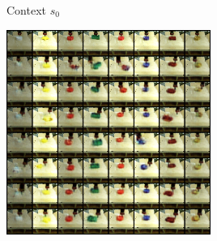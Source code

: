 \documentclass{article}
\begin{document}
\begin{figure}
    \centering
    \begin{subfigure}[b]{0.16\textwidth}
        \center
        Context $s_0$ \vspace{0.4cm}
    \end{subfigure}
    \begin{subfigure}[b]{0.4\textwidth}
        \center
         {
        }
    \end{subfigure}
    \hspace{0.1cm}
    \begin{subfigure}[b]{0.4\textwidth}
        \center
         {
        \includegraphics[height=252.5px]{img/cvae_samples_real_pusher3b.png}
        }
    \end{subfigure}
    \vspace{0.1cm}


\end{figure}
\end{document}

